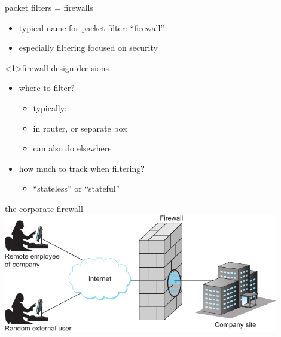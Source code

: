 \begin{frame}{packet filters = firewalls}
    \begin{itemize}
    \item typical name for packet filter: ``firewall''
    \item especially filtering focused on security
    \end{itemize}
\end{frame}

\begin{frame}[label=ffDesign]<1>{firewall design decisions}
    \begin{itemize}
    \item where to filter?
        \begin{itemize}
        \item typically: 
        \item in router, or separate box
        \item can also do elsewhere
        \end{itemize}
    \item how much to track when filtering?
        \begin{itemize}
        \item ``stateless'' or ``stateful''
        \end{itemize}
    \end{itemize}
\end{frame}

\begin{frame}{the corporate firewall}
\includegraphics[width=0.9\textwidth]{sysapp-fig214}
\end{frame}

